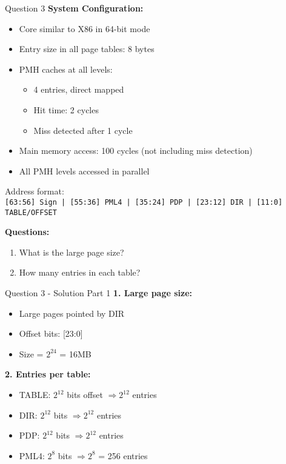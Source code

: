 \documentclass[aspectratio=169,12pt]{beamer}
\begin{document}
\begin{frame}{Question 3}
\textbf{System Configuration:}
\begin{itemize}
    \item Core similar to X86 in 64-bit mode
    \item Entry size in all page tables: 8 bytes
    \item PMH caches at all levels:
    \begin{itemize}
        \item 4 entries, direct mapped
        \item Hit time: 2 cycles
        \item Miss detected after 1 cycle
    \end{itemize}
    \item Main memory access: 100 cycles (not including miss detection)
    \item All PMH levels accessed in parallel
\end{itemize}

\vspace{1em}
Address format:\\
\texttt{[63:56] Sign | [55:36] PML4 | [35:24] PDP | [23:12] DIR | [11:0] TABLE/OFFSET}

\vspace{0.5em}
\textbf{Questions:}
\begin{enumerate}
    \item What is the large page size?
    \item How many entries in each table?
\end{enumerate}
\end{frame}

\begin{frame}{Question 3 - Solution Part 1}
\textbf{1. Large page size:}
\begin{itemize}
    \item Large pages pointed by DIR
    \item Offset bits: [23:0]
    \item Size = $2^{24}$ = 16MB
\end{itemize}

\vspace{1em}
\textbf{2. Entries per table:}
\begin{itemize}
    \item TABLE: $2^{12}$ bits offset $\Rightarrow 2^{12}$ entries
    \item DIR: $2^{12}$ bits $\Rightarrow 2^{12}$ entries  
    \item PDP: $2^{12}$ bits $\Rightarrow 2^{12}$ entries
    \item PML4: $2^{8}$ bits $\Rightarrow 2^{8}$ = 256 entries
\end{itemize}
\end{frame}
\end{document}
